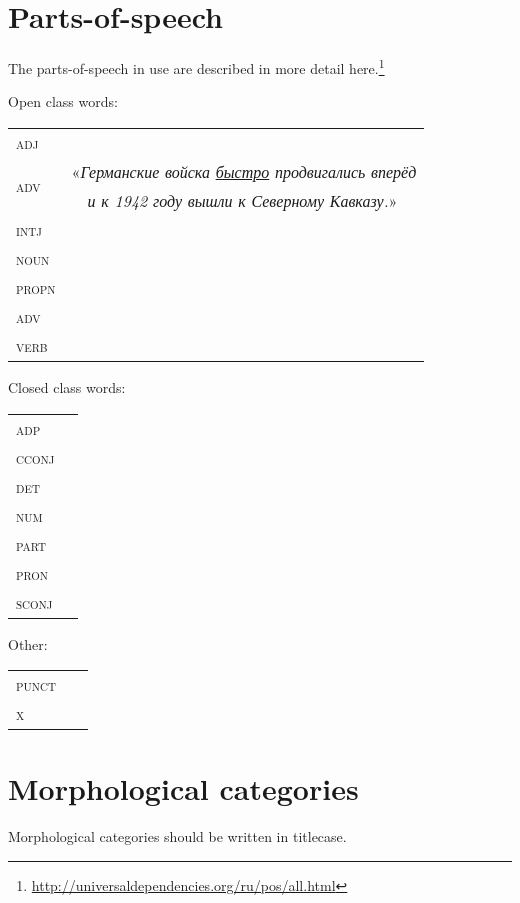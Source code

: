 \documentclass[a4paper,11pt, onecolumn,twoside]{article}
\newcommand{\gmk}[1]{{\rm {\ll \textsc{#1}}}}
\begin{document}
\section{Parts-of-speech}

The parts-of-speech in use are described in more detail here.\footnote{\url{http://universaldependencies.org/ru/pos/all.html}}

Open class words:

\begin{tabular}{ll}
   \gmk{adj} &    \\
   \multirow{2}{*}{\gmk{adv}} & «\emph{Германские войска \underline{быстро} продвигались вперёд} \\
                              & ~~\emph{и к 1942 году вышли к Северному Кавказу.}» \\
   \gmk{intj} &  \\
   \gmk{noun} &  \\
   \gmk{propn} &  \\
   \gmk{adv} &  \\
   \gmk{verb} &  \\
\end{tabular}

Closed class words:

\begin{tabular}{ll}
 \gmk{adp} &     \\
 \gmk{cconj} &    \\
 \gmk{det} &     \\
 \gmk{num} &     \\
 \gmk{part} &     \\
 \gmk{pron} &     \\
 \gmk{sconj} &     \\
\end{tabular}

Other:

\begin{tabular}{ll}
 \gmk{punct} & ~ \\
 \gmk{x} & ~ \\
\end{tabular}

\section{Morphological categories}


Morphological categories should be written in titlecase.
\end{document}
